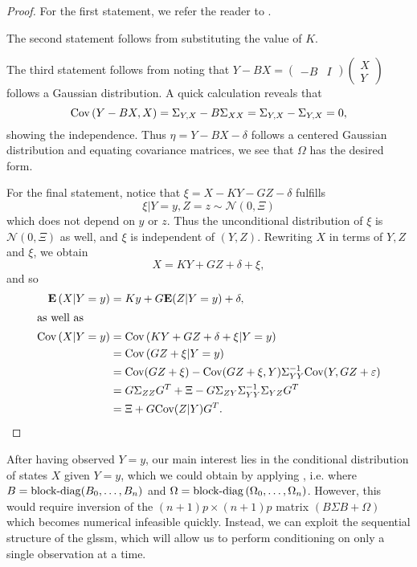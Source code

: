 \begin{proof}
    For the first statement, we refer the reader to \citep[Chapter 4, Lemma 1]{Durbin2012Time}.
    
    The second statement follows from substituting the value of $K$. 
    
    The third statement follows from noting that $Y-BX = \begin{pmatrix}
        -B & I
    \end{pmatrix} \begin{pmatrix}
        X \\ Y
    \end{pmatrix}$ follows a Gaussian distribution. A quick calculation reveals that $$\text{Cov} \left( Y- BX, X \right) = \Sigma_{Y,X} - B \Sigma_{XX} = \Sigma_{Y,X} - \Sigma_{Y,X} = 0,$$
    showing the independence. Thus $\eta = Y - BX - \delta$ follows a centered Gaussian distribution and equating covariance matrices, we see that $\Omega$ has the desired form.

    For the final statement, notice that $\xi = X - KY - GZ - \delta$ fulfills 
    $$
    \xi | Y = y, Z = z \sim \mathcal N(0, \Xi)
    $$
    which does not depend on $y$ or $z$. Thus the unconditional distribution of $\xi$ is $\mathcal N(0, \Xi)$ as well, and $\xi$ is independent of $(Y, Z)$. Rewriting $X$ in terms of $Y,Z$ and $\xi$, we obtain 
    $$
    X = KY + GZ + \delta + \xi,
    $$
    and so
    \begin{align*}
        \mathbf E \left( X | Y = y \right) &= Ky + G \mathbf E (Z| Y = y) + \delta,\\
        \intertext{as well as}
        \text{Cov} \left( X | Y = y \right) &= \text{Cov} \left(KY + GZ+\delta +\xi|  Y = y\right) \\
            &= \text{Cov} \left( GZ + \xi | Y = y  \right) \\
            &= \text{Cov} (GZ + \xi) - \text{Cov}(GZ + \xi, Y) \Sigma_{YY}^{-1} \text{Cov} (Y, GZ + \varepsilon)\\
            &= G \Sigma_{ZZ}G^{T} + \Xi - G \Sigma_{ZY}\Sigma_{YY}^{-1}\Sigma_{YZ}G^{T}\\
            &= \Xi + G \text{Cov}(Z|Y) G^{T}.
    \end{align*}
\end{proof}

After having observed $Y = y$, our main interest lies in the conditional distribution of states $X$ given $Y= y$, which we could obtain by applying , i.e. where $B = \operatorname{block-diag} (B_{0}, \dots, B_{n})$ and $\Omega = \operatorname{block-diag} \left( \Omega_{0}, \dots, \Omega_{n} \right)$. However, this would require inversion of the $(n+1)p\times(n+1)p$ matrix $\left( B\Sigma B + \Omega \right)$ which becomes numerical infeasible quickly. Instead, we can exploit the sequential structure of the \acrshort{glssm}, which will allow us to perform conditioning on only a single observation at a time. 

